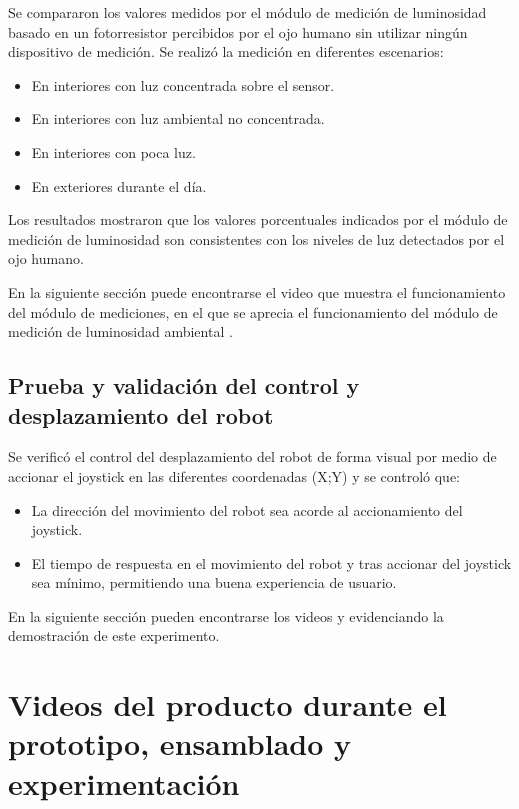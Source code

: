 Se compararon los valores medidos por el módulo de medición de luminosidad basado en un fotorresistor percibidos por el ojo humano sin utilizar ningún dispositivo de medición. Se realizó la medición en diferentes escenarios:

\begin{itemize}
	\item En interiores con luz concentrada sobre el sensor.
	\item En interiores con luz ambiental no concentrada.
	\item En interiores con poca luz.
	\item En exteriores durante el día.
\end{itemize}

Los resultados mostraron que los valores porcentuales indicados por el módulo de medición de luminosidad son consistentes con los niveles de luz detectados por el ojo humano.

En la siguiente sección puede encontrarse el video que muestra el funcionamiento del módulo de mediciones, en el que se aprecia el funcionamiento del módulo de medición de luminosidad ambiental \cite{Demo_Mediciones}.

\subsection{Prueba y validación del control y desplazamiento del robot}

Se verificó el control del desplazamiento del robot de forma visual por medio de accionar el joystick en las diferentes coordenadas (X;Y) y se controló que:

\begin{itemize}
	\item La dirección del movimiento del robot sea acorde al accionamiento del joystick.
	\item El tiempo de respuesta en el movimiento del robot y tras accionar del joystick sea mínimo, permitiendo una buena experiencia de usuario.
\end{itemize}

En la siguiente sección pueden encontrarse los videos \cite{Demo_Control_Movimiento_1} y \cite{Demo_Control_Movimiento_2} evidenciando la demostración de este experimento.



\section{Videos del producto durante el prototipo, ensamblado y experimentación}

